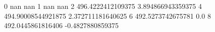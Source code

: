 0 nan nan
1 nan nan
2 496.4222412109375 3.894866943359375
4 494.90008544921875 2.372711181640625
6 492.5273742675781 0.0
8 492.0445861816406 -0.4827880859375
